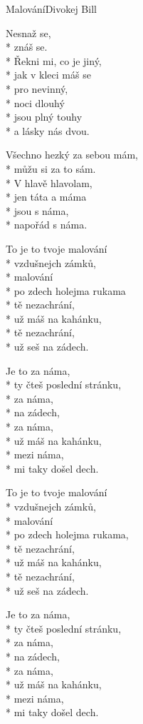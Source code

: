 \documentclass[10.5pt]{book}
\begin{document}
\begin{poem}{Malování}{Divokej Bill}

\settowidth{\versewidth}{jen táta a máma jsou s náma,}

Nesnaž se,\\*
znáš se.\\*
Řekni mi, co je jiný,\\*
jak v kleci máš se\\*
pro nevinný,\\*
noci dlouhý\\*
jsou plný touhy\\*
a lásky nás dvou.

Všechno hezký za sebou mám,\\*
můžu si za to sám.\\*
V hlavě hlavolam,\\*
jen táta a máma\\*
jsou s náma,\\*
napořád s náma.

To je to tvoje malování\\*
vzdušnejch zámků,\\*
malování\\*
po zdech holejma rukama\\*
tě nezachrání,\\*
už máš na kahánku,\\*
tě nezachrání,\\*
už seš na zádech.

\vfill\eject

Je to za náma,\\*
ty čteš poslední stránku,\\*
za náma,\\*
na zádech,\\*
za náma,\\*
už máš na kahánku,\\*
mezi náma,\\*
mi taky došel dech.

To je to tvoje malování\\*
vzdušnejch zámků,\\*
malování\\*
po zdech holejma rukama,\\*
tě nezachrání,\\*
už máš na kahánku,\\*
tě nezachrání,\\*
už seš na zádech.

Je to za náma,\\*
ty čteš poslední stránku,\\*
za náma,\\*
na zádech,\\*
za náma,\\*
už máš na kahánku,\\*
mezi náma,\\*
mi taky došel dech.


\end{poem}
\end{document}

